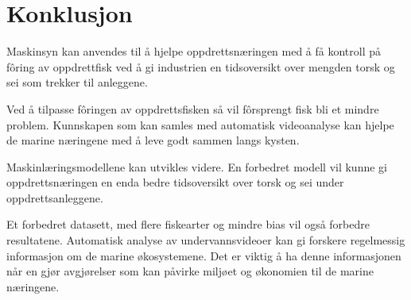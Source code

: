 

\section{Konklusjon}

\label{part:end}

Maskinsyn kan anvendes til å hjelpe oppdrettsnæringen med å få kontroll på fôring av oppdrettfisk ved å gi industrien en tidsoversikt over mengden torsk og sei som trekker til anleggene.

Ved å tilpasse fôringen av oppdrettsfisken så vil fôrsprengt fisk bli et mindre problem. Kunnskapen som kan samles med automatisk videoanalyse kan hjelpe de marine næringene med å leve godt sammen langs kysten.

Maskinlæringsmodellene kan utvikles videre. En forbedret modell vil kunne gi oppdrettsnæringen en enda bedre tidsoversikt over torsk og sei under oppdrettsanleggene.

Et forbedret datasett, med flere fiskearter og mindre bias vil også forbedre resultatene. Automatisk analyse av undervannsvideoer kan gi forskere regelmessig informasjon om de marine økosystemene. Det er viktig å ha denne informasjonen når en gjør avgjørelser som kan påvirke miljøet og økonomien til de marine næringene.
